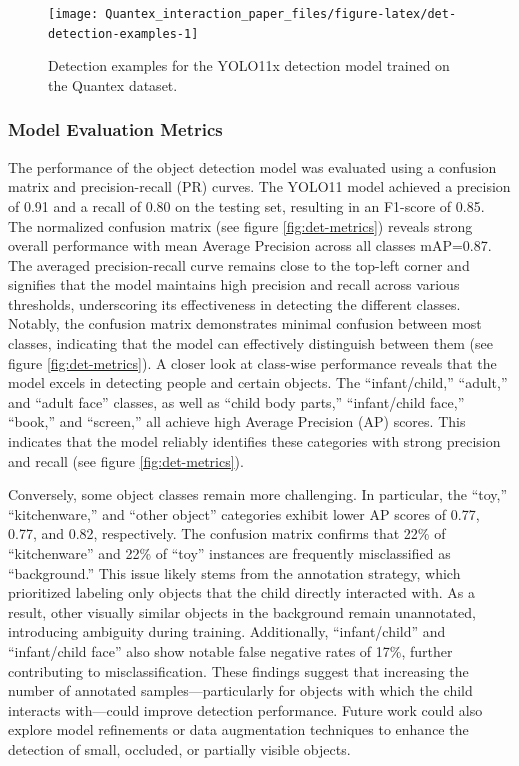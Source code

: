 \documentclass[
  man,floatsintext]{apa6}
\begin{document}
\begin{figure}

{\centering \texttt{[image: Quantex\_interaction\_paper\_files/figure-latex/det-detection-examples-1]} 

}

\caption{Detection examples for the YOLO11x detection model trained on the Quantex dataset.}\label{fig:det-detection-examples}
\end{figure}

\subsubsection{Model Evaluation Metrics}\label{model-evaluation-metrics}

The performance of the object detection model was evaluated using a confusion matrix and precision-recall (PR) curves. The YOLO11 model achieved a precision of 0.91 and a recall of 0.80 on the testing set, resulting in an F1-score of 0.85. The normalized confusion matrix (see figure \ref{fig:det-metrics}) reveals strong overall performance with mean Average Precision across all classes mAP=0.87. The averaged precision-recall curve remains close to the top-left corner and signifies that the model maintains high precision and recall across various thresholds, underscoring its effectiveness in detecting the different classes. Notably, the confusion matrix demonstrates minimal confusion between most classes, indicating that the model can effectively distinguish between them (see figure \ref{fig:det-metrics}). A closer look at class-wise performance reveals that the model excels in detecting people and certain objects. The ``infant/child,'' ``adult,'' and ``adult face'' classes, as well as ``child body parts,'' ``infant/child face,'' ``book,'' and ``screen,'' all achieve high Average Precision (AP) scores. This indicates that the model reliably identifies these categories with strong precision and recall (see figure \ref{fig:det-metrics}).

Conversely, some object classes remain more challenging. In particular, the ``toy,'' ``kitchenware,'' and ``other object'' categories exhibit lower AP scores of 0.77, 0.77, and 0.82, respectively. The confusion matrix confirms that 22\% of ``kitchenware'' and 22\% of ``toy'' instances are frequently misclassified as ``background.'' This issue likely stems from the annotation strategy, which prioritized labeling only objects that the child directly interacted with. As a result, other visually similar objects in the background remain unannotated, introducing ambiguity during training. Additionally, ``infant/child'' and ``infant/child face'' also show notable false negative rates of 17\%, further contributing to misclassification. These findings suggest that increasing the number of annotated samples---particularly for objects with which the child interacts with---could improve detection performance. Future work could also explore model refinements or data augmentation techniques to enhance the detection of small, occluded, or partially visible objects.
\end{document}
